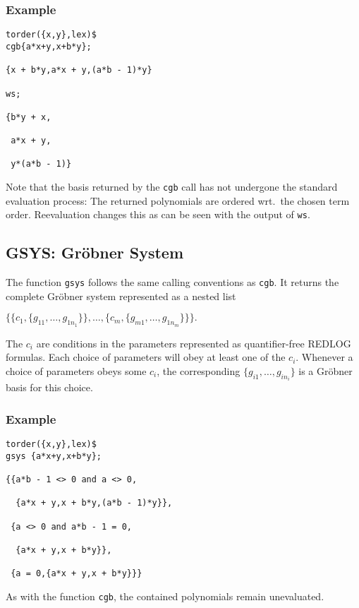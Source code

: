 \subsubsection*{Example}
\begin{verbatim}
torder({x,y},lex)$
cgb{a*x+y,x+b*y};

{x + b*y,a*x + y,(a*b - 1)*y}

ws;

{b*y + x,

 a*x + y,

 y*(a*b - 1)}
\end{verbatim}
Note that the basis returned by the \texttt{cgb} call has not undergone
the standard evaluation process: The returned polynomials are ordered
wrt.~the chosen term order. Reevaluation changes this as can be seen
with the output of \texttt{ws}.
%
\subsection{GSYS: Gr\"obner System}
 The function \texttt{gsys} follows the
same calling conventions as \texttt{cgb}. It returns the complete
Gr\"obner system represented as a nested list
\begin{center}
\begin{math}
\bigl\{\bigl\{c_1,\{g_{11},\ldots,g_{1n_1}\}\bigr\},\dots,
\bigl\{c_m,\{g_{m1},\dots,g_{1n_m}\}\bigr\}\bigr\}.
\end{math}
\end{center}
The $c_i$ are conditions in the parameters represented as
quantifier-free REDLOG formulas. Each choice of parameters will obey
at least one of the $c_i$. Whenever a choice of parameters obeys
some $c_i$, the corresponding $\{g_{i1},\ldots,g_{in_i}\}$
is a Gr\"obner basis for this choice.
%
\subsubsection*{Example}
\begin{verbatim}
torder({x,y},lex)$
gsys {a*x+y,x+b*y};

{{a*b - 1 <> 0 and a <> 0,

  {a*x + y,x + b*y,(a*b - 1)*y}},

 {a <> 0 and a*b - 1 = 0,

  {a*x + y,x + b*y}},

 {a = 0,{a*x + y,x + b*y}}}
\end{verbatim}
As with the function \texttt{cgb}, the contained polynomials remain
unevaluated.


